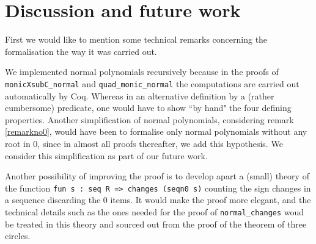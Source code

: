 \documentclass[11pt, a4paper]{article}
\begin{document}

\section{Discussion and future work}
\label{future}

First we would like to mention some technical remarks concerning the formalisation the way it was carried out.

We implemented normal polynomials recursively because in the proofs of \lstinline!monicXsubC_normal! and \lstinline!quad_monic_normal! the computations are carried out automatically by Coq. Whereas in an alternative definition by a (rather cumbersome) predicate, one would have to show ``by hand" the four defining properties. Another simplification of normal polynomials, considering remark \ref{remarkno0}, would have been to formalise only normal polynomials without any root in 0, since in almost all proofs thereafter, we add this hypothesis. We consider this simplification as part of our future work.

Another possibility of improving the proof is to develop apart a (small) theory of the function \lstinline!fun s : seq R => changes (seqn0 s)! counting the sign changes in a sequence discarding the 0 items. It would make the proof more elegant, and the technical details such as the ones needed for the proof of \lstinline!normal_changes! woud be treated in this theory and sourced out from the proof of the theorem of three circles.
\end{document}
